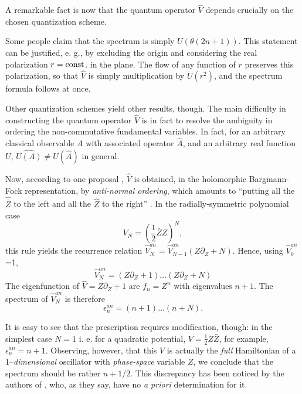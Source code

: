 \documentclass[a4paper,11pt]{article}
\newcommand{\half}{{\scriptstyle{\frac{1}{2}}}}
\newcommand{\const}{\mathop{\rm const}\nolimits}
\def\p{{\partial}}
\begin{document}
A remarkable fact is now that the quantum operator $\widehat{V}$
depends crucially on the chosen quantization scheme.

Some people \cite{BNS, HMC, GAMB2} claim that
the spectrum is simply $U(\theta(2n+1))$.
This statement can be justified, e. g.,
by excluding the origin and
considering the real polarization $r=\const$. in the plane.
The flow of any function of $r$ preserves this polarization, so that
  $\widehat{V}$ is simply multiplication by $U(r^2)$, and the
spectrum formula follows at once.

Other quantization schemes yield other results, though.
The main difficulty in constructing the quantum operator
$\widehat{V}$ is in fact to resolve
the ambiguity in ordering the non-commutative fundamental
variables. In fact, for an arbitrary
classical observable $A$ with  associated
operator $\widehat{A}$, and an arbitrary real function $U$,
$\widehat{U(A)}\neq U(\widehat{A})$ in general.

Now, according to one proposal \cite{DJT, DuJa, GJ},
$\widehat{V}$ is obtained, in the holomorphic Bargmann-Fock representation,
by {\it anti-normal ordering}, which amounts to ``putting all the
$\widehat{\bar{Z}}$ to
the left and all the $\widehat{Z}$ to the right'' \cite{GJ, DuJa}.
In the radially-symmetric polynomial case
\begin{equation}
     V_{N}=\left(\half{\bar{Z}Z}\right)^N,
    \label{Npot}
\end{equation}
this rule yields the recurrence relation
$
\widehat{V}^{an}_{N}=\widehat{V}^{an}_{N-1}(Z\p_{Z}+N).
$
Hence, using  $\widehat{V}^{an}_{0}$=1,
\begin{equation}
     \widehat{V}^{an}_{N}=(Z\p_{Z}+1)\dots(Z\p_{Z}+N)
     \label{Van}
\end{equation}
The eigenfunction of $\widehat{V}=Z\partial_{Z}+1$
  are $f_{n}=Z^n$ with eigenvalues $n+1$.
  The spectrum of $\widehat{V}^{an}_{N}$ is therefore
\begin{equation}
     \epsilon_{n}^{an}=(n+1)\dots(n+N).
     \label{Jopspect}
\end{equation}


It is easy to see that
the prescription requires modification, though: in the simplest case
$N=1$ i. e. for a quadratic potential,
$V=\half Z\bar{Z}$, for example, $\epsilon_{n}^{an}=n+1$.
  Observing, however, that this $V$ is actually the
  {\it full} Hamiltonian of
  a $1$--{\it dimensional} oscillator with {\it phase-space} variable $Z$,
we conclude that the spectrum should be rather $n+1/2$.
This discrepancy has been noticed by the authors of \cite{DJT}, who,
as they say, have no {\it a priori} determination for it.
\end{document}
